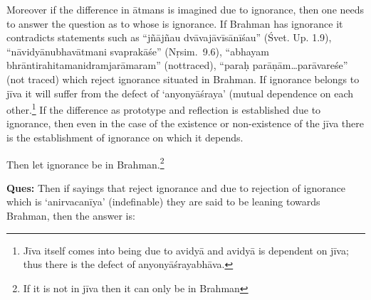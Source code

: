 Moreover if the difference in ātmans is imagined due to ignorance, then one needs to answer the question as to whose is ignorance. If Brahman has ignorance it contradicts statements such as “jñājñau dvāvajāvīsānīśau” (Śvet. Up. 1.9), “nāvidyānubhavātmani svaprakāśe” (Nṛsim.~9.6), “abhayam bhrāntirahitamanidramjarāmaram” (not\break traced), “paraḥ parāṇām…parāvareśe” (not traced) which reject ignorance situated in Brahman. If ignorance belongs to jīva it will suffer from the defect of ‘anyonyāśraya’ (mutual dependence on each other.\footnote{Jīva itself comes into being due to avidyā and avidyā is dependent on jīva; thus there is the defect of anyonyāśrayabhāva.} If the difference as prototype and reflection is established due to ignorance, then even in the case of the existence or non-existence of the jīva there is the establishment of ignorance on which it depends. 


Then let ignorance be in Brahman.\footnote{If it is not in jīva then it can only be in Brahman} 

\textbf{Ques:} Then if sayings that reject ignorance and due to rejection of ignorance which is ‘anirvacanīya’ (indefinable) they are said to be leaning towards Brahman, then the answer is: 

